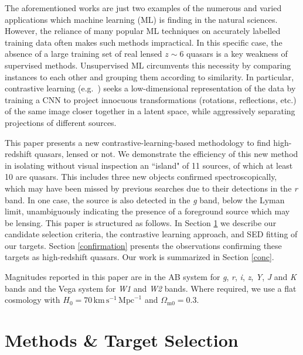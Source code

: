 \documentclass[fleqn,usenatbib]{mnras}
\begin{document}
The aforementioned works are just two examples of the numerous and varied applications which machine learning (ML) is finding in the natural sciences.
However, the reliance of many popular ML techniques on accurately labelled training data often makes such methods impractical.
In this specific case, the absence of a large training set of real lensed $z\sim6$ quasars is a key weakness of supervised methods.
Unsupervised ML circumvents this necessity by comparing instances to each other and grouping them according to similarity.
In particular, contrastive learning (e.g.\ \citealt{chen20}) seeks a low-dimensional representation of the data by training a CNN to project innocuous transformations (rotations, reflections, etc.) of the same image closer together in a latent space, while aggressively separating projections of different sources.

This paper presents a new contrastive-learning-based methodology to find high-redshift quasars, lensed or not.
We demonstrate the efficiency of this new method in isolating without visual inspection an ``island" of 11 sources, of which at least 10 are quasars.
This includes three new objects confirmed spectroscopically, which may have been missed by previous searches due to their detections in the \textit{r} band.
In one case, the source is also detected in the \textit{g} band, below the Lyman limit, unambiguously indicating the presence of a foreground source which may be lensing.
This paper is structured as follows. 
In Section \ref{methods} we describe our candidate selection criteria, the contrastive learning approach, and SED fitting of our targets.
Section \ref{confirmation} presents the observations confirming these targets as high-redshift quasars.
Our work is summarized in Section \ref{conc}.

Magnitudes reported in this paper are in the AB system for \textit{g}, \textit{r}, \textit{i}, \textit{z}, \textit{Y}, \textit{J} and \textit{K} bands and the Vega system for \textit{W1} and \textit{W2} bands.
Where required, we use a flat cosmology with $H_0=70\,\text{km}\,\text{s}^{-1}\,\text{Mpc}^{-1}$ and $\Omega_{\mathrm{m}0}=0.3$.


\section{Methods \& Target Selection} \label{methods}
\end{document}
